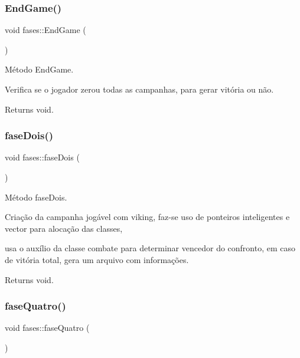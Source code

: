 \subsubsection{\texorpdfstring{End\+Game()}{EndGame()}}
{\footnotesize\ttfamily void fases\+::\+End\+Game (\begin{DoxyParamCaption}{ }\end{DoxyParamCaption})}



Método End\+Game. 

Verifica se o jogador zerou todas as campanhas, para gerar vitória ou não. \begin{DoxyReturn}{Returns}
void. 
\end{DoxyReturn}
\mbox{\label{classfases_a2f19632bd94eacd6c5437a2774bc529f}} 
\subsubsection{\texorpdfstring{fase\+Dois()}{faseDois()}}
{\footnotesize\ttfamily void fases\+::fase\+Dois (\begin{DoxyParamCaption}{ }\end{DoxyParamCaption})}



Método fase\+Dois. 

Criação da campanha jogável com viking, faz-\/se uso de ponteiros inteligentes e vector para alocação das classes,

usa o auxílio da classe combate para determinar vencedor do confronto, em caso de vitória total, gera um arquivo com informações. \begin{DoxyReturn}{Returns}
void. 
\end{DoxyReturn}
\mbox{\label{classfases_af33d3aefdf442b1ea726645b0c946d78}} 
\subsubsection{\texorpdfstring{fase\+Quatro()}{faseQuatro()}}
{\footnotesize\ttfamily void fases\+::fase\+Quatro (\begin{DoxyParamCaption}{ }\end{DoxyParamCaption})}



